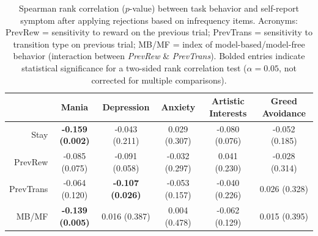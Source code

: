 \documentclass[a4paper,notitlepage,12pt]{article}
\begin{document}
\begin{table}[H]
    \centering
    \begin{adjustbox}{center}   
    \small
    \begin{tabular}{rccccc}
        \toprule
        {} & Mania & Depression & Anxiety & Artistic Interests & Greed Avoidance \\
        \midrule
        Stay      &  \textbf{-0.159 (0.002)} &           -0.043 (0.211) &   0.029 (0.307) &  -0.080 (0.076) &  -0.052 (0.185) \\
        PrevRew   &           -0.085 (0.075) &           -0.091 (0.058) &  -0.032 (0.297) &   0.041 (0.230) &  -0.028 (0.314) \\
        PrevTrans &           -0.064 (0.120) &  \textbf{-0.107 (0.026)} &  -0.053 (0.157) &  -0.040 (0.226) &   0.026 (0.328) \\
        MB/MF     &  \textbf{-0.139 (0.005)} &            0.016 (0.387) &   0.004 (0.478) &  -0.062 (0.129) &   0.015 (0.395) \\
        \bottomrule
    \end{tabular}
    \end{adjustbox}
    \caption{Spearman rank correlation ($p$-value) between task behavior and self-report symptom after applying rejections based on infrequency items. Acronyms: PrevRew = sensitivity to reward on the previous trial; PrevTrans = sensitivity to transition type on previous trial; MB/MF = index of model-based/model-free behavior (interaction between \textit{PrevRew} \& \textit{PrevTrans}). Bolded entries indicate statistical significance for a two-sided rank correlation test ($\alpha = 0.05$, not corrected for multiple comparisons).}
\end{table}
\end{document}
